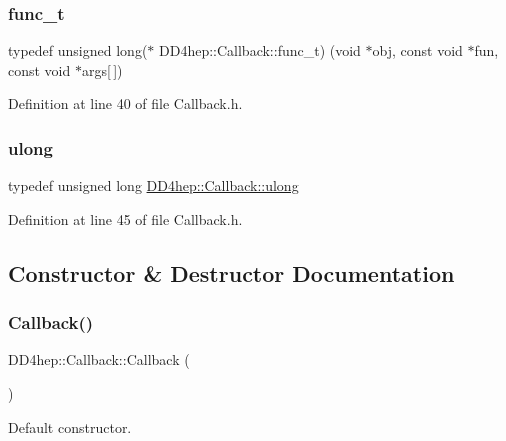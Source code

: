 \subsubsection{\texorpdfstring{func\+\_\+t}{func\_t}}
{\footnotesize\ttfamily typedef unsigned long($\ast$ D\+D4hep\+::\+Callback\+::func\+\_\+t) (void $\ast$obj, const void $\ast$fun, const void $\ast$args\mbox{[}$\,$\mbox{]})}



Definition at line 40 of file Callback.\+h.

\hypertarget{class_d_d4hep_1_1_callback_ac676aa0685e2ba51bac69c33f8066431}{}\label{class_d_d4hep_1_1_callback_ac676aa0685e2ba51bac69c33f8066431} 
\subsubsection{\texorpdfstring{ulong}{ulong}}
{\footnotesize\ttfamily typedef unsigned long \hyperlink{class_d_d4hep_1_1_callback_ac676aa0685e2ba51bac69c33f8066431}{D\+D4hep\+::\+Callback\+::ulong}}



Definition at line 45 of file Callback.\+h.



\subsection{Constructor \& Destructor Documentation}
\hypertarget{class_d_d4hep_1_1_callback_af29b371d4eb53f3e27df8c3250899950}{}\label{class_d_d4hep_1_1_callback_af29b371d4eb53f3e27df8c3250899950} 
\subsubsection{\texorpdfstring{Callback()}{Callback()}\hspace{0.1cm}{\footnotesize\ttfamily [1/3]}}
{\footnotesize\ttfamily D\+D4hep\+::\+Callback\+::\+Callback (\begin{DoxyParamCaption}{ }\end{DoxyParamCaption})\hspace{0.3cm}{\ttfamily [inline]}}



Default constructor. 



